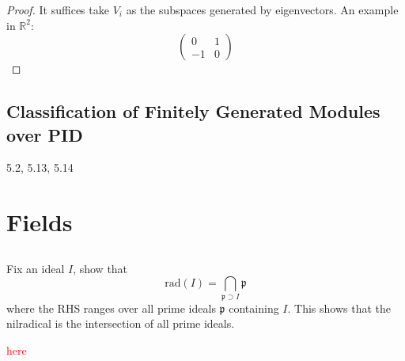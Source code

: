 \documentclass[openany]{book}
\newcommand{\R}{\mathbb{R}}
\begin{document}
\begin{proof}
    It suffices take $V_i$ as the subspaces generated by eigenvectors.
    An example in $\R^2$:
    \begin{equation*}
        \begin{pmatrix}
            0&1\\
            -1&0
        \end{pmatrix}
    \end{equation*}

\end{proof}


\section{Classification of Finitely Generated Modules over PID}

5.2, 5.13, 5.14

































\chapter{Fields}




\section{}


\begin{prob}
    Fix an ideal $I$, show that 
    \begin{equation*}
        \text{rad}(I)=\bigcap_{\mathfrak{p}\supset I}\mathfrak{p}
    \end{equation*}
    where the RHS ranges over all prime ideals $\mathfrak{p}$ containing $I$. This shows that the nilradical is the intersection of all prime ideals.
\end{prob}
\textcolor{red}{here}
\end{document}
